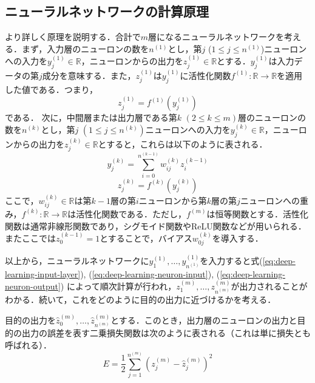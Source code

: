 \subsection{ニューラルネットワークの計算原理 \label{subsection:neuron-principles}}
より詳しく原理を説明する．合計で$m$層になるニューラルネットワークを考える．まず，入力層のニューロンの数を$n^{(1)}$とし，第$j$ ($1 \leq j \leq n^{(1)}$)ニューロンへの入力を$y_j^{(1)} \in \mathbb{R}$，ニューロンからの出力を$z_j^{(1)} \in \mathbb{R}$とする．$y_j^{(1)}$は入力データの第$j$成分を意味する．また，$z_j^{(1)}$は$y_j^{(1)}$に活性化関数$f^{(1)}: \mathbb{R} \rightarrow \mathbb{R}$を適用した値である．つまり，
\begin{equation}
  z_j^{(1)} = f^{(1)}(y_j^{(1)})
  \label{eq:deep-learning-input-layer}
\end{equation}
である．
次に，中間層または出力層である第$k$ $(2 \leq k \leq m)$層のニューロンの数を$n^{(k)}$とし，第$j$ $(1 \leq j \leq n^{(k)})$ニューロンへの入力を$y_j^{(k)} \in \mathbb{R}$，ニューロンからの出力を$z_j^{(k)} \in \mathbb{R}$とすると，これらは以下のように表される．
\begin{equation}
  y_j^{(k)} = \sum_{i=0}^{n^{(k-1)}} w_{ij}^{(k)} z_i^{(k-1)}
  \label{eq:deep-learning-neuron-input}
\end{equation}
\begin{equation}
  z_j^{(k)} = f^{(k)}(y_j^{(k)})
  \label{eq:deep-learning-neuron-output}
\end{equation}
ここで，$w_{ij}^{(k)} \in \mathbb{R}$は第$k-1$層の第$i$ニューロンから第$k$層の第$j$ニューロンへの重み，$f^{(k)}: \mathbb{R} \rightarrow \mathbb{R}$は活性化関数である．ただし，$f^{(m)}$は恒等関数とする．活性化関数は通常非線形関数であり，シグモイド関数やReLU関数などが用いられる．またここでは$z_0^{(k-1)} = 1$とすることで，バイアス$w_{0j}^{(k)}$を導入する．

以上から，ニューラルネットワークに$y_1^{(1)}, \dots, y_{n^{(1)}}^{(1)}$を入力すると式(\ref{eq:deep-learning-input-layer}), (\ref{eq:deep-learning-neuron-input}), (\ref{eq:deep-learning-neuron-output})
によって順次計算が行われ，$z_1^{(m)}, \dots, z_{n^{(m)}}^{(m)}$が出力されることがわかる．続いて，これをどのように目的の出力に近づけるかを考える．

目的の出力を$\hat{z}_0^{(m)}, \dots, \hat{z}_{n^{(m)}}^{(m)}$とする．このとき，出力層のニューロンの出力と目的の出力の誤差を表す二乗損失関数は次のように表される（これは単に損失とも呼ばれる）．
\begin{equation}
  E = \frac{1}{2} \sum_{j=1}^{n^{(m)}} \left( z_j^{(m)} - \hat{z}_j^{(m)} \right)^2
  \label{eq:deep-learning-loss}
\end{equation}

